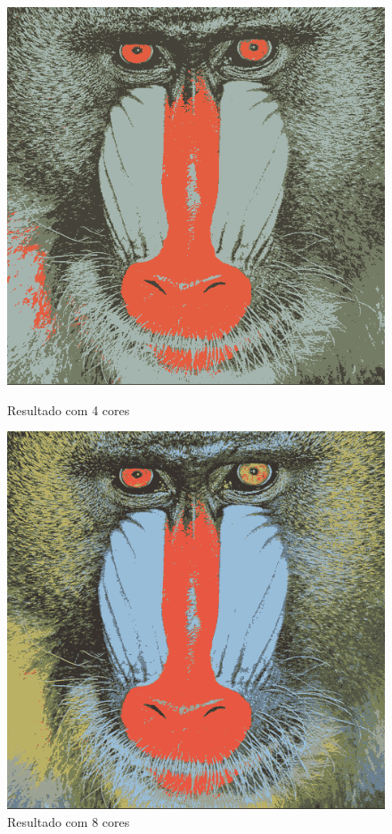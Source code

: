 \documentclass{article}
\begin{document}
\begin{figure}[!htb]
  \begin{minipage}{0.42\textwidth}
    \centering
    \includegraphics[width=.99\linewidth]{images/res4.png}
    \caption{Resultado com 4 cores}\label{Fig:res4}
  \end{minipage}\hfill
  \begin{minipage}{0.42\textwidth}
    \centering
    \includegraphics[width=.99\linewidth]{images/res8.png}
    \caption{Resultado com 8 cores}\label{Fig:res8}
  \end{minipage}
\end{figure}
\end{document}
